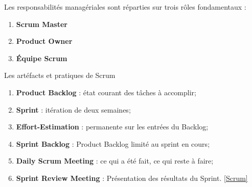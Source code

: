 Les responsabilités managériales sont réparties sur trois rôles fondamentaux :
\begin{enumerate}
	\item \textbf{Scrum Master}
	\item \textbf{Product Owner}
	\item \textbf{Équipe Scrum}
	\newline
\end{enumerate}
Les artéfacts et pratiques de Scrum
\begin{enumerate}
	\item \textbf{Product Backlog} : état courant des tâches à accomplir;
	\item \textbf{Sprint} : itération de deux semaines;
	\item \textbf{Effort-Estimation} : permanente sur les entrées du Backlog;
	\item \textbf{Sprint Backlog} : Product Backlog limité au sprint en cours;
	\item \textbf{Daily Scrum Meeting} : ce qui a été fait, ce qui reste à faire;
	\item \textbf{Sprint Review Meeting} : Présentation des résultats du Sprint. \ref{Scrum}
	\newline \newline
\end{enumerate}

